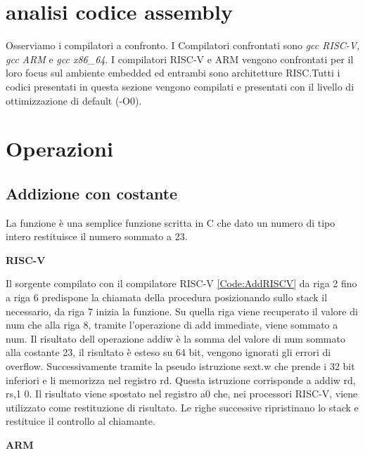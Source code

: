 \documentclass[12pt,a4paper]{report}
\begin{document}
	
\section{analisi codice assembly}
Osserviamo i compilatori a confronto.  I Compilatori confrontati sono \textit{gcc RISC-V},  \textit{gcc ARM} e \textit{gcc x86\_64}.  I compilatori RISC-V e ARM vengono confrontati per il loro focus sul ambiente embedded ed entrambi sono architetture RISC.Tutti i codici presentati in questa sezione vengono compilati e presentati con il livello di ottimizzazione di default (-O0).


\section{Operazioni}
\subsection{Addizione con costante}



La funzione è una semplice funzione scritta in C che dato un numero di tipo intero restituisce il numero sommato a 23. 

\vspace{0.3 cm}
\textbf{RISC-V}

\vspace{0.3 cm}
Il sorgente compilato con il compilatore RISC-V \ref{Code:AddRISCV} da riga 2 fino a riga 6 predispone la chiamata della procedura posizionando sullo stack il necessario, da riga 7 inizia la funzione. Su quella riga viene recuperato il valore di num che alla riga 8, tramite l'operazione di add immediate, viene sommato a num. Il risultato dell operazione addiw è la somma del valore di num sommato alla costante 23, il risultato è esteso su 64 bit, vengono ignorati gli errori di overflow. Successivamente tramite la pseudo istruzione sext.w che prende i 32 bit inferiori e li memorizza nel registro rd.  Questa istruzione corrisponde a addiw rd, rs,1 0. Il risultato viene spostato nel registro a0 che, nei processori RISC-V, viene utilizzato come restituzione di risultato. Le righe successive ripristinano lo stack e restituice il controllo al chiamante.

\vspace{0.3 cm}
\textbf{ARM}

\vspace{0.3 cm}
\end{document}

